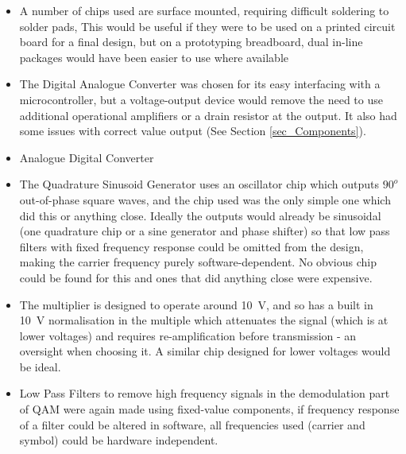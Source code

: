 \documentclass[../main.tex]{subfiles}
\begin{document}
\begin{itemize}
	\item A number of chips used are surface mounted, requiring difficult soldering to solder pads, This would be useful if they were to be used on a printed circuit board for a final design, but on a prototyping breadboard, dual in-line packages would have been easier to use where available
	\item The Digital Analogue Converter was chosen for its easy interfacing with a microcontroller, but a voltage-output device would remove the need to use additional operational amplifiers or a drain resistor at the output. It also had some issues with correct value output (See Section \ref{sec_Components}).
	\item Analogue Digital Converter
	\item The Quadrature Sinusoid Generator uses an oscillator chip which outputs $90^o$ out-of-phase square waves, and the chip used was the only simple one which did this or anything close. Ideally the outputs would already be sinusoidal (one quadrature chip or a sine generator and phase shifter) so that low pass filters with fixed frequency response could be omitted from the design, making the carrier frequency purely software-dependent. No obvious chip could be found for this and ones that did anything close were expensive.
	\item The multiplier is designed to operate around \SI{10}{\volt}, and so has a built in \SI{10}{\volt} normalisation in the multiple which attenuates the signal (which is at lower voltages) and requires re-amplification before transmission - an oversight when choosing it. A similar chip designed for lower voltages would be ideal.
	\item Low Pass Filters to remove high frequency signals in the demodulation part of QAM were again made using fixed-value components, if frequency response of a filter could be altered in software, all frequencies used (carrier and symbol) could be hardware independent.
\end{itemize}

\clearpage

\end{document}
